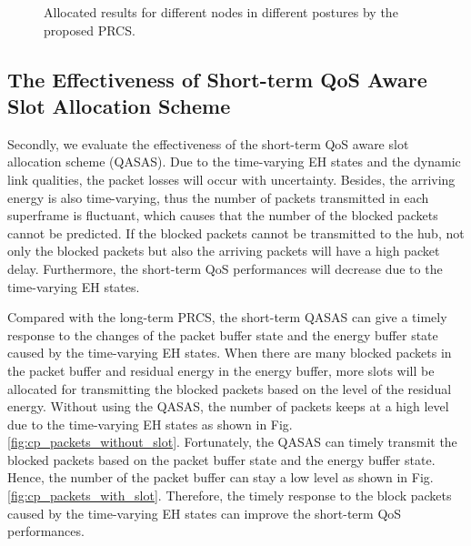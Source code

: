 \documentclass[journal,10pt]{IEEEtran}
\begin{document}
\begin{figure}[!htb]
\centering
    \hspace{0.1cm}
\caption{Allocated results for different nodes in different postures by the proposed PRCS.}
\label{fig:PRCS}
\end{figure}


\subsection{The Effectiveness of Short-term QoS Aware Slot Allocation Scheme}

Secondly, we evaluate the effectiveness of the short-term QoS aware slot allocation scheme (QASAS). Due to the time-varying EH states and the dynamic link qualities, the packet losses will occur with uncertainty. Besides, the arriving energy is also time-varying, thus the number of packets transmitted in each superframe is fluctuant, which causes that the number of the blocked packets cannot be predicted. If the blocked packets cannot be transmitted to the hub, not only the blocked packets but also the arriving packets will have a high packet delay. Furthermore, the short-term QoS performances will decrease due to the time-varying EH states.

Compared with the long-term PRCS, the short-term QASAS can give a timely response to the changes of the packet buffer state and the energy buffer state caused by the time-varying EH states. When there are many blocked packets in the packet buffer and residual energy in the energy buffer, more slots will be allocated for transmitting the blocked packets based on the level of the residual energy. Without using the QASAS, the number of packets keeps at a high level due to the time-varying EH states as shown in Fig. \ref{fig:cp_packets_without_slot}.
Fortunately, the QASAS can timely transmit the blocked packets based on the packet buffer state and the energy buffer state. Hence, the number of the packet buffer can stay a low level as shown in Fig. \ref{fig:cp_packets_with_slot}.
Therefore, the timely response to the block packets caused by the time-varying EH states can improve the short-term QoS performances.
\end{document}
